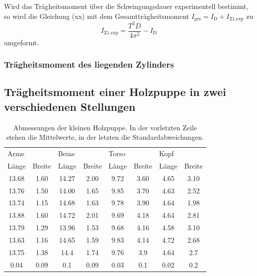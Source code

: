 Wird das Trägheitsmoment über die Schwingungsdauer experimentell bestimmt, so
wird die Gleichung (xx) mit dem Gesamtträgheitsmoment $I_\text{ges} = I_\text{D}
+ I_\text{Z1,exp}$ zu
\begin{equation}
  I_\text{Z1,exp} = \frac{T^2 D}{4 \pi^2} - I_\text{D}
  \label{eqn:I_zstehend-exp}
\end{equation}
umgeformt.


\subsubsection{Trägheitsmoment des liegenden Zylinders}

\subsection{Trägheitsmoment einer Holzpuppe in zwei verschiedenen Stellungen}

\begin{table}
  \centering
  \begin{tabular}{c c c c c c c c}
    \toprule
    \multicolumn{2}{l}{Arme} & \multicolumn{2}{l}{Beine} & \multicolumn{2}{l}{Torso}
    & \multicolumn{2}{l}{Kopf} \\
    Länge & Breite & Länge & Breite & Länge & Breite & Länge & Breite \\
    \midrule
    13.68 & 1.60 & 14.27 & 2.00 & 9.72 & 3.60 & 4.65 & 3.10 \\
    13.76 & 1.50 & 14.00 & 1.65 & 9.85 & 3.70 & 4.63 & 2.52 \\
    13.74 & 1.15 & 14.68 & 1.63 & 9.78 & 3.90 & 4.64 & 1.98 \\
    13.88 & 1.60 & 14.72 & 2.01 & 9.69 & 4.18 & 4.64 & 2.81 \\
    13.79 & 1.29 & 13.96 & 1.53 & 9.68 & 4.16 & 4.58 & 3.10 \\
    13.63 & 1.16 & 14.65 & 1.59 & 9.83 & 4.14 & 4.72 & 2.68 \\
    \midrule
    13.75 & 1.38 & 14.4 & 1.74 & 9.76 & 3.9 & 4.64 & 2.7 \\
    0.04  & 0.09 & 0.1  & 0.09 & 0.03 & 0.1 & 0.02 & 0.2 \\
    \bottomrule
  \end{tabular}
  \caption{Abmessungen der kleinen Holzpuppe. In der vorletzten Zeile stehen die
  Mittelwerte, in der letzten die Standardabweichungen.}
  \label{tab:abmessungen_puppe}
\end{table}

